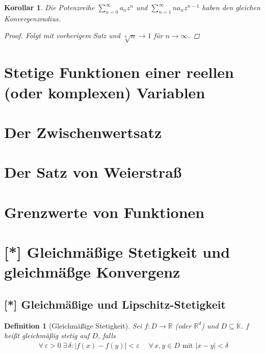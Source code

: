 \documentclass[11pt, twoside, a4paper]{article}
\theoremstyle{plain}
\newtheorem{definition}[blockelement]{Definition}
\newtheorem{korollar}[blockelement]{Korollar}
\newcommand{\abs}[1]{\left\lvert#1\right\rvert}
\newcommand{\fromto}{\rightarrow{}}
\newcommand{\sbset}{\subseteq}
\newcommand{\fa}{\;\forall\,}
\newcommand{\ex}{\;\exists\,}
\newcommand{\R}{\mathbb{R}}
\newcommand{\K}{\mathbb{K}}
\begin{document}
    \begin{korollar}
        Die Potenzreihe $ \sum_{n=0}^{\infty} a_n z^n$ und $ \sum_{n=1}^{\infty} n a_n z^{n-1}$ haben den gleichen Konvergenzradius.
        \begin{proof}
            Folgt mit vorherigem Satz und $\sqrt[n]{n}\fromto 1$ für $n\fromto\infty$.
        \end{proof}
    \end{korollar}

    \newpage


    \section{Stetige Funktionen einer reellen (oder komplexen) Variablen}
    


    \section{Der Zwischenwertsatz}
    


    \section{Der Satz von Weierstraß}
    


    \section{Grenzwerte von Funktionen}
    


    \section{[*] Gleichmäßige Stetigkeit und gleichmäßge Konvergenz}

    \subsection{[*] Gleichmäßige und Lipschitz-Stetigkeit}
    \thispagestyle{pagenumberonly}

    \begin{definition}[Gleichmäßige Stetigkeit] %
        Sei $f: D\fromto \R$ (oder $\R^d$) und $D\sbset\K$. $f$ heißt gleichmäßig stetig auf $D$, falls
        \begin{align*}
            \fa\varepsilon > 0\ex\delta\colon \abs{f(x)-f(y)} < \varepsilon\quad\fa x,y\in D \text{ mit } \abs{x-y} < \delta
        \end{align*}
    \end{definition}
\end{document}
